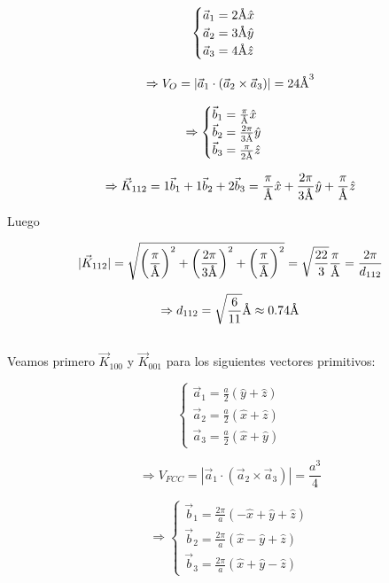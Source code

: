 \documentclass[a4paper]{article}
\begin{document}
$$\begin{cases}
\vec{a}_{1} = 2 \textup{\r{A}}\hat{x}\\
\vec{a}_{2} = 3 \textup{\r{A}} \hat{y} \\
\vec{a}_{3} = 4 \textup{\r{A}} \hat{z}
\end{cases}$$

$$\Rightarrow V_{O} = | \vec{a}_{1} \cdot (\vec{a}_{2} \times \vec{a}_{3})| = 24 \textup{\r{A}}^{3} $$

$$\Rightarrow \begin{cases}
\vec{b}_{1} = \frac{\pi}{\textup{\r{A}}}\hat{x} \\
\vec{b}_{2} = \frac{2\pi}{3\textup{\r{A}}}\hat{y} \\
\vec{b}_{3} = \frac{\pi}{2\textup{\r{A}}}\hat{z}
\end{cases}$$

$$\Rightarrow \vec{K}_{112} = 1\vec{b}_{1} + 1\vec{b}_{2} + 2\vec{b}_{3} = \frac{\pi}{\textup{\r{A}}}\hat{x} + \frac{2\pi}{3\textup{\r{A}}}\hat{y} + \frac{\pi}{\textup{\r{A}}}\hat{z}$$

Luego

$$| \vec{K}_{112} | = \sqrt{\bigg(\frac{\pi}{\textup{\r{A}}}\bigg)^{2} + \bigg(\frac{2\pi}{3\textup{\r{A}}}\bigg)^{2} + \bigg(\frac{\pi}{\textup{\r{A}}}\bigg)^{2}} =  \sqrt{\frac{22}{3}} \frac{\pi}{\textup{\r{A}}} =  \frac{2\pi}{d_{112}}$$

$$ \Rightarrow d_{112} = \sqrt{\frac{6}{11}}\textup{\r{A}} \approx 0.74 \textup{\r{A}}$$

\subsection{}

Veamos primero $\vec{K}_{100}$ y $\vec{K}_{001}$ para los siguientes vectores primitivos:

$$\begin{cases}
\vec{a}_{1} = \frac{a}{2} (\hat{y} + \hat{z})\\
\vec{a}_{2} = \frac{a}{2} (\hat{x} + \hat{z}) \\
\vec{a}_{3} = \frac{a}{2} (\hat{x} + \hat{y})
\end{cases}$$

$$\Rightarrow V_{FCC} = | \vec{a}_{1} \cdot (\vec{a}_{2} \times \vec{a}_{3})| = \frac{a^{3}}{4} $$

$$\Rightarrow \begin{cases}
\vec{b}_{1} = \frac{2\pi}{a}(-\hat{x} + \hat{y} + \hat{z}) \\
\vec{b}_{2} = \frac{2\pi}{a}(\hat{x} - \hat{y} + \hat{z}) \\
\vec{b}_{3} = \frac{2\pi}{a}(\hat{x} + \hat{y} - \hat{z})
\end{cases}$$
\end{document}
